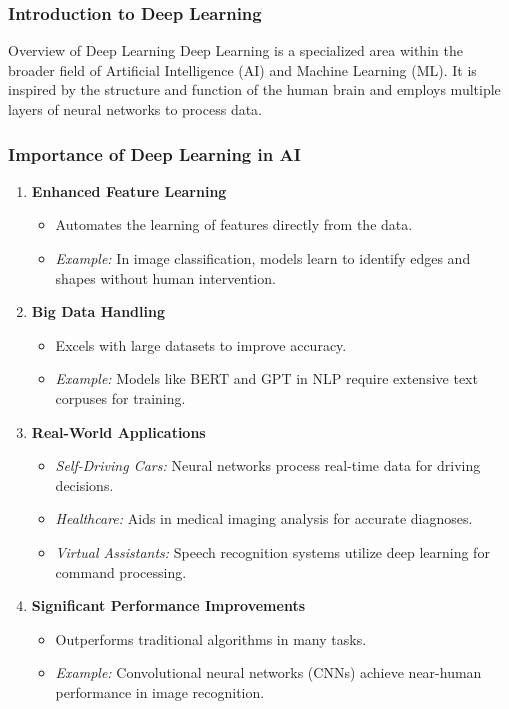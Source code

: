 \documentclass[aspectratio=169]{beamer}
\begin{document}
\frame{\titlepage}

\begin{frame}[fragile]
    \frametitle{Introduction to Deep Learning}
    \begin{block}{Overview of Deep Learning}
        Deep Learning is a specialized area within the broader field of Artificial Intelligence (AI) and Machine Learning (ML). It is inspired by the structure and function of the human brain and employs multiple layers of neural networks to process data.
    \end{block}
\end{frame}

\begin{frame}[fragile]
    \frametitle{Importance of Deep Learning in AI}
    \begin{enumerate}
        \item \textbf{Enhanced Feature Learning}
            \begin{itemize}
                \item Automates the learning of features directly from the data.
                \item \textit{Example:} In image classification, models learn to identify edges and shapes without human intervention.
            \end{itemize}
        \item \textbf{Big Data Handling}
            \begin{itemize}
                \item Excels with large datasets to improve accuracy.
                \item \textit{Example:} Models like BERT and GPT in NLP require extensive text corpuses for training.
            \end{itemize}
        \item \textbf{Real-World Applications}
            \begin{itemize}
                \item \textit{Self-Driving Cars:} Neural networks process real-time data for driving decisions.
                \item \textit{Healthcare:} Aids in medical imaging analysis for accurate diagnoses.
                \item \textit{Virtual Assistants:} Speech recognition systems utilize deep learning for command processing.
            \end{itemize}
        \item \textbf{Significant Performance Improvements}
            \begin{itemize}
                \item Outperforms traditional algorithms in many tasks.
                \item \textit{Example:} Convolutional neural networks (CNNs) achieve near-human performance in image recognition.
            \end{itemize}
    \end{enumerate}
\end{frame}
\end{document}
